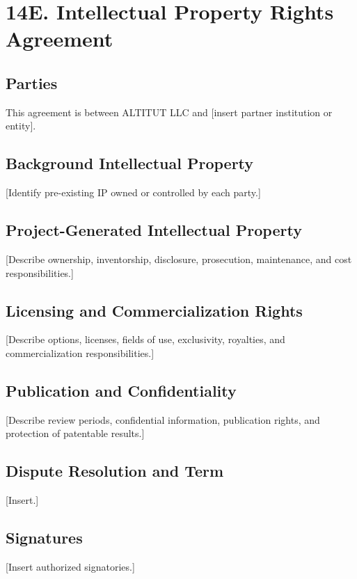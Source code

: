 \documentclass[11pt,letterpaper]{article}
\begin{document}
\section*{14E. Intellectual Property Rights Agreement}


\subsection*{Parties}
This agreement is between ALTITUT LLC and [insert partner institution or entity].

\subsection*{Background Intellectual Property}
[Identify pre-existing IP owned or controlled by each party.]

\subsection*{Project-Generated Intellectual Property}
[Describe ownership, inventorship, disclosure, prosecution, maintenance, and
cost responsibilities.]

\subsection*{Licensing and Commercialization Rights}
[Describe options, licenses, fields of use, exclusivity, royalties, and
commercialization responsibilities.]

\subsection*{Publication and Confidentiality}
[Describe review periods, confidential information, publication rights, and
protection of patentable results.]

\subsection*{Dispute Resolution and Term}
[Insert.]

\subsection*{Signatures}
[Insert authorized signatories.]
\end{document}
